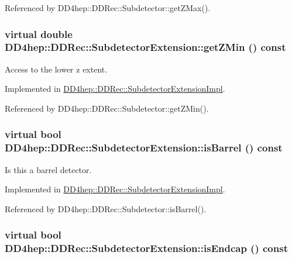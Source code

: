 Referenced by DD4hep::DDRec::Subdetector::getZMax().\hypertarget{class_d_d4hep_1_1_d_d_rec_1_1_subdetector_extension_a5229b92c90c65a76156b5ea082aa0301}{
\subsubsection[{getZMin}]{\setlength{\rightskip}{0pt plus 5cm}virtual double DD4hep::DDRec::SubdetectorExtension::getZMin () const}}
\label{class_d_d4hep_1_1_d_d_rec_1_1_subdetector_extension_a5229b92c90c65a76156b5ea082aa0301}


Access to the lower z extent. 

Implemented in \hyperlink{class_d_d4hep_1_1_d_d_rec_1_1_subdetector_extension_impl_afe7437d86975e37f4b81e61631145591}{DD4hep::DDRec::SubdetectorExtensionImpl}.

Referenced by DD4hep::DDRec::Subdetector::getZMin().\hypertarget{class_d_d4hep_1_1_d_d_rec_1_1_subdetector_extension_a12be99462aa14feba6df7eed02468994}{
\subsubsection[{isBarrel}]{\setlength{\rightskip}{0pt plus 5cm}virtual bool DD4hep::DDRec::SubdetectorExtension::isBarrel () const}}
\label{class_d_d4hep_1_1_d_d_rec_1_1_subdetector_extension_a12be99462aa14feba6df7eed02468994}


Is this a barrel detector. 

Implemented in \hyperlink{class_d_d4hep_1_1_d_d_rec_1_1_subdetector_extension_impl_a3a024678317cb6cf0f0794c041b70b96}{DD4hep::DDRec::SubdetectorExtensionImpl}.

Referenced by DD4hep::DDRec::Subdetector::isBarrel().\hypertarget{class_d_d4hep_1_1_d_d_rec_1_1_subdetector_extension_a57a044e743f899391ac4a89fc0035e08}{
\subsubsection[{isEndcap}]{\setlength{\rightskip}{0pt plus 5cm}virtual bool DD4hep::DDRec::SubdetectorExtension::isEndcap () const}}
\label{class_d_d4hep_1_1_d_d_rec_1_1_subdetector_extension_a57a044e743f899391ac4a89fc0035e08}


